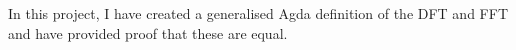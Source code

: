 \documentclass[12pt, twoside]{article}
\begin{document}
In this project, I have created a generalised Agda definition of the DFT and FFT
and have provided proof that these are equal.




\clearpage

\clearpage
{}
\tableofcontents
\clearpage
\setlength{\parskip}{0.5em}
\clearpage







\clearpage


\end{document}
